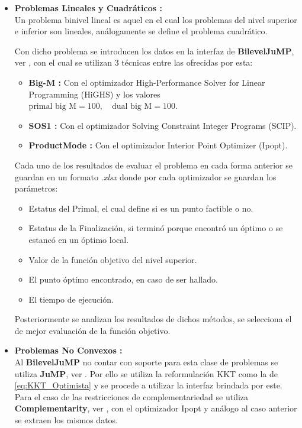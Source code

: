 \begin{itemize}
    \item \textbf{Problemas Lineales y Cuadráticos :}\\
            Un problema binivel lineal es aquel en el cual los problemas del nivel superior e inferior son lineales, análogamente se define el problema cuadrático.
            
            Con dicho problema se introducen los datos en la interfaz de \textbf{BilevelJuMP}, ver \cite{BilevelJump}, con el cual se utilizan 3 técnicas entre las ofrecidas por esta:
            \begin{itemize}
                \item \textbf{Big-M :} Con el optimizador High-Performance Solver for Linear Programming (HiGHS) y los valores $\text{primal big M} = 100, \quad \text{dual big M} = 100$.
                \item \textbf{SOS1 :} Con el optimizador Solving Constraint Integer Programs (SCIP).
                \item \textbf{ProductMode :} Con el optimizador Interior Point Optimizer (Ipopt).
            \end{itemize} 
            Cada uno de los resultados de evaluar el problema en cada forma anterior se guardan en un formato \textit{.xlsx}
            donde por cada optimizador se guardan los parámetros:
            \begin{itemize}
                \item Estatus del Primal, el cual define si es un punto factible o no.
                \item Estatus de la Finalización, si terminó porque encontró un óptimo o se estancó en un óptimo local.
                \item Valor de la función objetivo del nivel superior.
                \item El punto óptimo encontrado, en caso de ser hallado.
                \item El tiempo de ejecución.
            \end{itemize} 
            Posteriormente se analizan los resultados de dichos métodos, se selecciona el de mejor evaluación de la función objetivo.
    \item \textbf{Problemas No Convexos :}\\
            Al \textbf{BilevelJuMP} no contar con soporte para esta clase de problemas se utiliza \textbf{JuMP}, ver \cite{JuMPPaper}.
            Por ello se utiliza la reformulación KKT como la de \ref{eq:KKT_Optimista} y se procede a utilizar la interfaz brindada por este. Para el caso de las restricciones de 
            complementariedad se utiliza \textbf{Complementarity}, ver \cite{Complementarityjl}, con el optimizador Ipopt y análogo al caso anterior se extraen los mismos datos.
\end{itemize}



